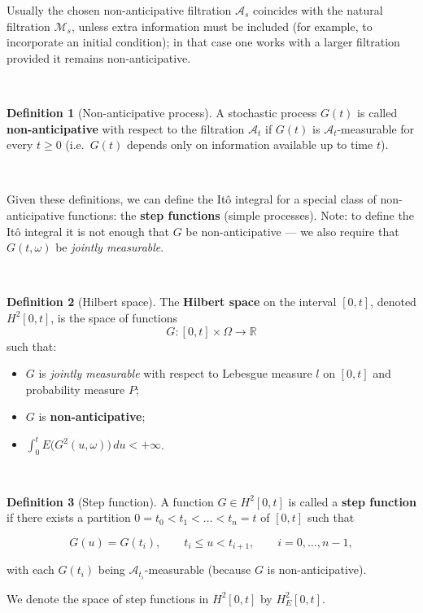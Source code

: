 \documentclass[
  11pt,
  a4paper,
]{book}
\theoremstyle{definition}
\newtheorem{definition}{Definition}[chapter]
\theoremstyle{definition}
\theoremstyle{definition}
\theoremstyle{definition}
\theoremstyle{remark}
\begin{document}
Usually the chosen non-anticipative filtration \(\mathcal{A}_s\) coincides with the natural filtration \(\mathcal{M}_s\), unless extra information must be included (for example, to incorporate an initial condition); in that case one works with a larger filtration provided it remains non-anticipative.

\(\,\)

\begin{definition}[Non-anticipative process]
A stochastic process \(G(t)\) is called \textbf{non-anticipative} with respect to the filtration \(\mathcal{A}_t\) if \(G(t)\) is \(\mathcal{A}_t\)-measurable for every \(t\ge 0\) (i.e.~\(G(t)\) depends only on information available up to time \(t\)).
\end{definition}

\(\,\)

Given these definitions, we can define the Itô integral for a special class of non-anticipative functions: the \textbf{step functions} (simple processes). Note: to define the Itô integral it is not enough that \(G\) be non-anticipative --- we also require that \(G(t,\omega)\) be \emph{jointly measurable}.

\(\,\)

\begin{definition}[Hilbert space]

The \textbf{Hilbert space} on the interval \([0,t]\), denoted \(H^2[0,t]\), is the space of functions
\[
G:[0,t]\times\Omega\to\mathbb{R}
\]
such that:

\begin{itemize}
\item
  \(G\) is \emph{jointly measurable} with respect to Lebesgue measure \(l\) on \([0,t]\) and probability measure \(P\);
\item
  \(G\) is \textbf{non-anticipative};
\item
  \(\displaystyle \int_0^t E\big(G^2(u,\omega)\big)\,du < +\infty\).
\end{itemize}

\end{definition}

\(\,\)

\begin{definition}[Step function]
A function \(G\in H^2[0,t]\) is called a \textbf{step function} if there exists a partition \(0=t_0<t_1<\dots<t_n=t\) of \([0,t]\) such that

\[
G(u)=G(t_i),\qquad t_i\le u < t_{i+1},\qquad i=0,\dots,n-1,
\]

with each \(G(t_i)\) being \(\mathcal{A}_{t_i}\)-measurable (because \(G\) is non-anticipative).

We denote the space of step functions in \(H^2[0,t]\) by \(H_E^2[0,t]\).
\end{definition}
\end{document}
